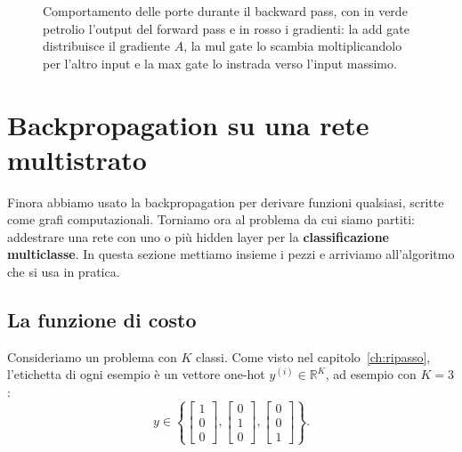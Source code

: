 \begin{figure}[htbp]
\centering
{}
\caption{Comportamento delle porte durante il backward pass, con in verde petrolio l'output del forward pass e in rosso i gradienti: la add gate distribuisce il gradiente $A$, la mul gate lo scambia moltiplicandolo per l'altro input e la max gate lo instrada verso l'input massimo.}
\label{fig:porte}
\end{figure}

\section{Backpropagation su una rete multistrato}\label{sec:backprop-mlp}
Finora abbiamo usato la backpropagation per derivare funzioni qualsiasi, scritte come grafi computazionali. Torniamo ora al problema da cui siamo partiti: addestrare una rete con uno o più hidden layer per la \textbf{classificazione multiclasse}. In questa sezione mettiamo insieme i pezzi e arriviamo all'algoritmo che si usa in pratica.

\subsection{La funzione di costo}
Consideriamo un problema con $K$ classi. Come visto nel capitolo~\ref{ch:ripasso}, l'etichetta di ogni esempio è un vettore one-hot $y^{(i)} \in \mathbb{R}^K$, ad esempio con $K = 3$:
\[
y \in \left\{ \begin{bmatrix} 1 \\ 0 \\ 0 \end{bmatrix}, \begin{bmatrix} 0 \\ 1 \\ 0 \end{bmatrix}, \begin{bmatrix} 0 \\ 0 \\ 1 \end{bmatrix} \right\}.
\]

